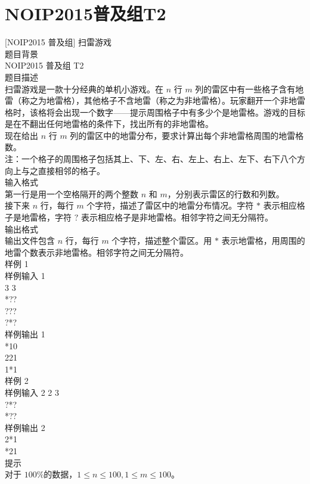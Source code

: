 \documentclass[12pt,twiside,a4paper]{ctexbook}
\numberwithin{chapter}{part}
\begin{document}
\section{NOIP2015普及组T2}
[NOIP2015 普及组] 扫雷游戏\\
题目背景\\
NOIP2015 普及组 T2\\
题目描述\\
扫雷游戏是一款十分经典的单机小游戏。在 $n$ 行 $m$ 列的雷区中有一些格子含有地雷（称之为地雷格），其他格子不含地雷（称之为非地雷格）。玩家翻开一个非地雷格时，该格将会出现一个数字——提示周围格子中有多少个是地雷格。游戏的目标是在不翻出任何地雷格的条件下，找出所有的非地雷格。\\
现在给出 $n$ 行 $m$ 列的雷区中的地雷分布，要求计算出每个非地雷格周围的地雷格数。\\
注：一个格子的周围格子包括其上、下、左、右、左上、右上、左下、右下八个方向上与之直接相邻的格子。\\
输入格式\\
第一行是用一个空格隔开的两个整数 $n$ 和 $m$，分别表示雷区的行数和列数。\\
接下来 $n$ 行，每行 $m$ 个字符，描述了雷区中的地雷分布情况。字符 $\texttt{*}$ 表示相应格子是地雷格，字符 $\texttt{?}$ 表示相应格子是非地雷格。相邻字符之间无分隔符。\\
输出格式\\
输出文件包含 $n$ 行，每行 $m$ 个字符，描述整个雷区。用 $\texttt{*}$ 表示地雷格，用周围的地雷个数表示非地雷格。相邻字符之间无分隔符。\\
样例 1\\
样例输入 1\\
3 3\\
*??\\
???\\
?*?\\
 样例输出 1\\
*10\\
221\\
1*1\\
 样例 2\\
 样例输入 2
2 3\\
?*?\\
*??\\
 样例输出 2\\
2*1\\
*21\\
 提示\\
对于 $100\%$的数据，$1≤n≤100, 1≤m≤100$。
\end{document}

